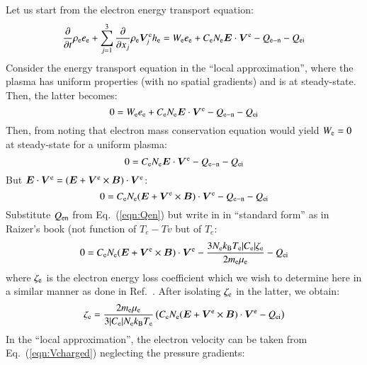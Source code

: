 \documentclass{warpdoc}
\renewcommand{\vec}[1]{\bm{#1}}
\begin{document}
Let us start from the electron energy transport equation:
%
\begin{equation}
\frac{\partial }{\partial t}\rho_{\rm e} e_{\rm e} + \sum_{j=1}^3  \frac{\partial }{\partial x_j} \rho_{\rm e} \vec{V}^{\rm e}_j h_{\rm e} 
= 
 W_{\rm e} e_{\rm e}
+   C_{\rm e} N_{\rm e} \vec{E} \cdot \vec{V}^{\rm e}  
- Q_{\rm e-n}
- Q_{\rm ei}
\end{equation}
%
Consider the energy transport equation in the ``local approximation'', where the plasma has uniform properties (with no spatial gradients) and is at steady-state. Then, the latter becomes:
%
\begin{equation}
0
= 
 W_{\rm e} e_{\rm e}
+   C_{\rm e} N_{\rm e} \vec{E} \cdot \vec{V}^{\rm e}  
- Q_{\rm e-n}
- Q_{\rm ei}
\end{equation}
%
Then, from noting that electron mass conservation equation would yield $W_{\rm e}=0$ at steady-state for a uniform plasma:
%
\begin{equation}
0
= 
   C_{\rm e} N_{\rm e} \vec{E} \cdot \vec{V}^{\rm e}  
- Q_{\rm e-n}
- Q_{\rm ei}
\end{equation}
%
But $\vec{E} \cdot \vec{V}^{\rm e}=(\vec{E}+\vec{V}^{\rm e}\times\vec{B}) \cdot \vec{V}^{\rm e}$:
%
\begin{equation}
0
= 
   C_{\rm e} N_{\rm e} (\vec{E}+\vec{V}^{\rm e}\times\vec{B}) \cdot \vec{V}^{\rm e}  
- Q_{\rm e-n}
- Q_{\rm ei}
\end{equation}
%
Substitute $Q_{\rm en}$ from Eq.\ (\ref{eqn:Qen}) but write in in ``standard form'' as in Raizer's book (not function of $T_e-Tv$ but of $T_e$:
%
\begin{equation}
0
= 
   C_{\rm e} N_{\rm e} (\vec{E}+\vec{V}^{\rm e}\times\vec{B}) \cdot \vec{V}^{\rm e}  
- \frac{3 N_{\rm e}k_{\rm B} T_{\rm e}  |C_{\rm e}| \zeta_{\rm e}}{2 m_{\rm e}\mu_{\rm e}}
- Q_{\rm ei}
\end{equation}
%
where  $\zeta_{\rm e}$ is the electron energy loss coefficient which we wish to determine here in a similar manner as done in Ref.\ \cite{misc:1995:boeuf}. After isolating $\zeta_{\rm e}$ in the latter, we obtain:
%
\begin{equation}
  \zeta_{\rm e}   
=  
 \frac{2 m_{\rm e} \mu_{\rm e}}{3 |C_{\rm e}| N_{\rm e} k_{\rm B} T_{\rm e} }
\left(  C_{\rm e} N_{\rm e} (\vec{E}+\vec{V}^{\rm e}\times\vec{B}) \cdot \vec{V}^{\rm e}
 - Q_{\rm ei}\right)
\label{eqn:zetae1}
 \end{equation}
%
In the ``local approximation'',  the electron velocity can be taken from Eq.\ (\ref{eqn:Vcharged}) neglecting the pressure gradients:
\end{document}
